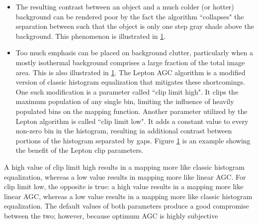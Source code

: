 \begin{itemize}
    \item The resulting contrast between an object and a much colder (or hotter)
background can be rendered poor by the fact the algorithm ``collapses" the
separation between such that the object is only one step gray shade above the
background. This phenomenon is illustrated in \ref{fig:comparisionlinearAGC}.
    \item Too much emphasis can be placed on background clutter, particularly
when a mostly isothermal background comprises a large fraction of the total
image area. This is also illustrated in \ref{fig:comparisionlinearAGC}. The
Lepton AGC algorithm is a modified version of classic histogram equalization
that mitigates these shortcomings. One such modification is a parameter called
``clip limit high". It clips the maximum population of any single bin, limiting
the influence of heavily populated bins on the mapping function. Another
parameter utilized by the Lepton algorithm is called ``clip limit low". It adds
a constant value to every non-zero bin in the histogram, resulting in additional
contrast between portions of the histogram separated by gaps. Figure
\ref{fig:comparisionlinearAGC} is an example showing the benefit of the Lepton
clip parameters.
%
\end{itemize}
\begin{figure}[htb]
    \centering
     \quad
     \quad
    \label{fig:comparisionlinearAGC}
\end{figure}
%
\newpage
A high value of clip limit high results in a mapping more like classic histogram
equalization, whereas a low value results in mapping more like linear AGC. For
clip limit low, the opposite is true: a high value results in a mapping more
like linear AGC, whereas a low value results in a mapping more like classic
histogram equalization. The default values of both parameters produce a good
compromise between the two; however, because optimum AGC is highly subjective
